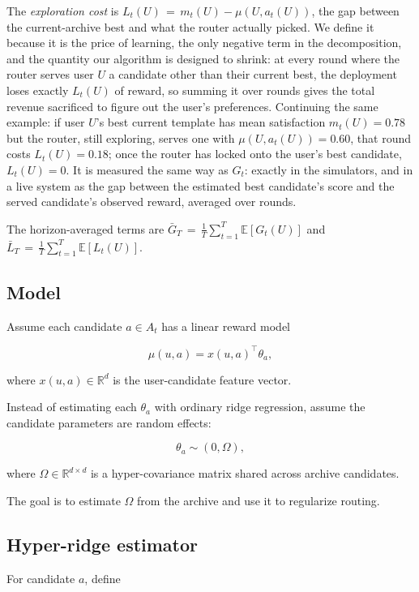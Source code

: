 \documentclass{article} %
\providecommand{\E}{\mathbb{E}}
\begin{document}
The \emph{exploration cost} is $L_t(U) \,=\, m_t(U) - \mu(U, a_t(U))$, the gap between the current-archive best and what the router actually picked. We define it because it is the price of learning, the only negative term in the decomposition, and the quantity our algorithm is designed to shrink: at every round where the router serves user $U$ a candidate other than their current best, the deployment loses exactly $L_t(U)$ of reward, so summing it over rounds gives the total revenue sacrificed to figure out the user's preferences. Continuing the same example: if user $U$'s best current template has mean satisfaction $m_t(U) = 0.78$ but the router, still exploring, serves one with $\mu(U, a_t(U)) = 0.60$, that round costs $L_t(U) = 0.18$; once the router has locked onto the user's best candidate, $L_t(U) = 0$. It is measured the same way as $G_t$: exactly in the simulators, and in a live system as the gap between the estimated best candidate's score and the served candidate's observed reward, averaged over rounds.


The horizon-averaged terms are $\bar G_T \,=\, \frac{1}{T}\sum_{t=1}^T \E[G_t(U)]$ and $\bar L_T \,=\, \frac{1}{T}\sum_{t=1}^T \E[L_t(U)]$.

\subsection{Model}
\label{sec:method-model}

Assume each candidate $a \in A_t$ has a linear reward model

\[
\mu(u, a) = x(u, a)^\top \theta_a ,
\]

where $x(u, a) \in \mathbb{R}^d$ is the user-candidate feature vector.

Instead of estimating each $\theta_a$ with ordinary ridge regression, assume
the candidate parameters are random effects:

\[
\theta_a \sim (0, \Omega),
\]

where $\Omega \in \mathbb{R}^{d \times d}$ is a hyper-covariance matrix shared
across archive candidates.

The goal is to estimate $\Omega$ from the archive and use it to regularize
routing.

\subsection{Hyper-ridge estimator}

For candidate $a$, define
\end{document}
